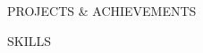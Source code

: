 \documentclass{resume}
\begin{document}
\vspace{\SpacerAboveCategory}
\begin{rSection}{PROJECTS \& ACHIEVEMENTS}
\vspace{\SpacerBelowCategory}







\end{rSection}


\vspace{\SpacerAboveCategory}
\begin{rSection}{SKILLS}
\vspace{\SpacerBelowCategory}


\vspace{\SpacerAboveTopic}

\vspace{\SpacerBelowTopic}

\end{rSection}
\end{document}
